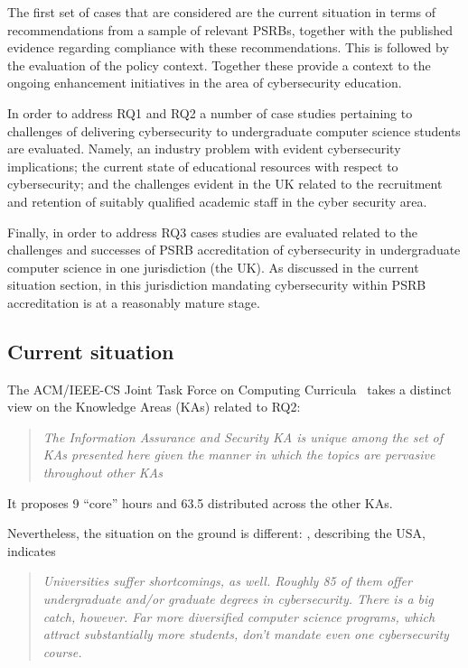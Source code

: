 \documentclass[conference]{IEEEtran}
\begin{document}
The first set of cases that are considered are the current situation in terms of recommendations from a sample of relevant PSRBs, together with the published evidence regarding compliance with these recommendations. This is followed by the evaluation of the policy context. Together these provide a context to the ongoing enhancement initiatives in the area of cybersecurity education.

In order to address RQ1 and RQ2 a number of case studies pertaining to challenges of delivering cybersecurity to undergraduate computer science students are evaluated. Namely, an industry problem with evident cybersecurity implications; the current state of educational resources with respect to cybersecurity; and the challenges evident in the UK related to the recruitment and retention of suitably qualified academic staff in the cyber security area. 

Finally, in order to address RQ3 cases studies are evaluated related to the challenges and successes of PSRB accreditation of cybersecurity in undergraduate computer science in one jurisdiction (the UK). As discussed in the current situation section, in this jurisdiction mandating cybersecurity within PSRB accreditation is at a reasonably mature stage.

\subsection{Current situation}
The ACM/IEEE-CS Joint Task Force on Computing Curricula~\cite[p.~97]{ACM2013a} takes a distinct view on the Knowledge Areas (KAs) related to RQ2:
\begin{quote}
{\emph{The Information Assurance and Security KA is unique among the set of KAs presented here
given the manner in which the topics are pervasive throughout other KAs}}
\end{quote}
It proposes 9 ``core'' hours and 63.5 distributed across the other KAs.
\par
Nevertheless, the situation on the ground is different: \cite{Ackerman2019a}, describing the USA, indicates
\begin{quote}
{\emph{Universities suffer shortcomings, as well. Roughly 85 of them offer undergraduate and/or graduate degrees in cybersecurity. There is a big catch, however. Far more diversified computer science programs, which attract substantially more students, don't mandate even one cybersecurity course.}}
\end{quote}
\end{document}
